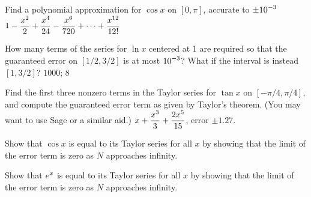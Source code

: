 \exercises

\exercise Find a polynomial approximation for $\cos x$ on $[0,\pi]$,
accurate to $\displaystyle \pm 10^{-3}$
\answer $\displaystyle 1-{x^2\over2}+{x^4\over24}-{x^6\over 720}
+\cdots+{x^{12}\over 12!}$
\endanswer
\endexercise

\exercise How many terms of the series for $\ln x$ centered at 1 are
required so that the guaranteed error on $[1/2,3/2]$ is
at most $\displaystyle 10^{-3}$? What if the interval is instead $[1,3/2]$? 
\answer $1000$; $8$ 
\endanswer
\endexercise

\exercise Find the first three nonzero terms in the Taylor series for
$\tan x$ on $[-\pi/4,\pi/4]$,
and compute the guaranteed error term as given by 
Taylor's theorem. (You may want to use Sage or a similar aid.)
\answer $\displaystyle x+{x^3\over3}+{2x^5\over15}$, error $\pm 1.27$.
\endanswer
\endexercise

\exercise Show that $\cos x$ is equal to its Taylor series for all $x$
by showing that the limit of the error term is zero as $N$ approaches
infinity. 
\endexercise

\exercise Show that $\displaystyle e^x$ is equal to its Taylor series for all $x$
by showing that the limit of the error term is zero as $N$ approaches
infinity. 
\endexercise

\endexercises
